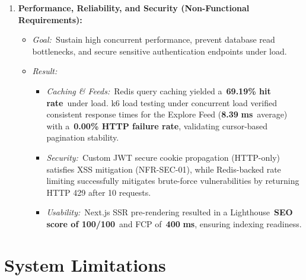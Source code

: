 \begin{enumerate}
  \item \textbf{Performance, Reliability, and Security (Non-Functional Requirements):}
\begin{itemize}
  \item \textit{Goal:}~Sustain high concurrent performance, prevent database read bottlenecks, and secure sensitive authentication endpoints under load.
  \item \textit{Result:}
\begin{itemize}
  \item \textit{Caching \& Feeds:}~Redis query caching yielded a~\textbf{69.19\% hit rate}~under load. k6 load testing under concurrent load verified consistent response times for the Explore Feed (\textbf{8.39 }\textbf{ms}~average) with a~\textbf{0.00\% HTTP failure rate}, validating cursor-based pagination stability.
  \item \textit{Security:}~Custom JWT secure cookie propagation (HTTP-only) satisfies XSS mitigation (NFR-SEC-01), while Redis-backed rate limiting successfully mitigates brute-force vulnerabilities by returning HTTP 429 after 10 requests.
  \item \textit{Usability:}~Next.js SSR pre-rendering resulted in a Lighthouse~\textbf{SEO score of 100/100}~and FCP of~\textbf{400 }\textbf{ms}, ensuring indexing readiness.
\end{itemize}
\end{itemize}
\end{enumerate}

\section{System Limitations}

